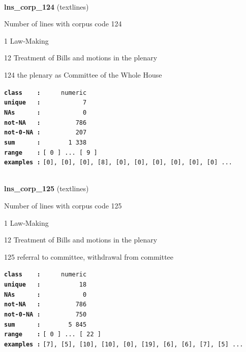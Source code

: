 \documentclass[]{article}
\begin{document}
~

\textbf{lns\_corp\_124} (textlines)

Number of lines with corpus code 124

1 Law-Making

12 Treatment of Bills and motions in the plenary

124 the plenary as Committee of the Whole House

\textbf{\texttt{class\ \ \ \ :}} \texttt{~~~~~numeric}\\
\textbf{\texttt{unique\ \ \ :}} \texttt{~~~~~~~~~~~7}\\
\textbf{\texttt{NAs\ \ \ \ \ \ :}} \texttt{~~~~~~~~~~~0}\\
\textbf{\texttt{not-NA\ \ \ :}} \texttt{~~~~~~~~~786}\\
\textbf{\texttt{not-0-NA\ :}} \texttt{~~~~~~~~~207}\\
\textbf{\texttt{sum\ \ \ \ \ \ :}} \texttt{~~~~~~~1~338}\\
\textbf{\texttt{range\ \ \ \ :}}
\texttt{{[}\ 0\ {]}\ ...\ {[}\ 9\ {]}}\\
\textbf{\texttt{examples\ :}}
\texttt{{[}0{]},\ {[}0{]},\ {[}0{]},\ {[}8{]},\ {[}0{]},\ {[}0{]},\ {[}0{]},\ {[}0{]},\ {[}0{]},\ {[}0{]}\ ...}\\

~

\textbf{lns\_corp\_125} (textlines)

Number of lines with corpus code 125

1 Law-Making

12 Treatment of Bills and motions in the plenary

125 referral to committee, withdrawal from committee

\textbf{\texttt{class\ \ \ \ :}} \texttt{~~~~~numeric}\\
\textbf{\texttt{unique\ \ \ :}} \texttt{~~~~~~~~~~18}\\
\textbf{\texttt{NAs\ \ \ \ \ \ :}} \texttt{~~~~~~~~~~~0}\\
\textbf{\texttt{not-NA\ \ \ :}} \texttt{~~~~~~~~~786}\\
\textbf{\texttt{not-0-NA\ :}} \texttt{~~~~~~~~~750}\\
\textbf{\texttt{sum\ \ \ \ \ \ :}} \texttt{~~~~~~~5~845}\\
\textbf{\texttt{range\ \ \ \ :}}
\texttt{{[}\ 0\ {]}\ ...\ {[}\ 22\ {]}}\\
\textbf{\texttt{examples\ :}}
\texttt{{[}7{]},\ {[}5{]},\ {[}10{]},\ {[}10{]},\ {[}0{]},\ {[}19{]},\ {[}6{]},\ {[}6{]},\ {[}7{]},\ {[}5{]}\ ...}\\
\end{document}
